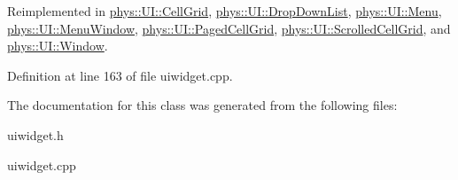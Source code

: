 Reimplemented in \hyperlink{classphys_1_1UI_1_1CellGrid_addbc1338b3b321018cbaf3ff787837e5}{phys::UI::CellGrid}, \hyperlink{classphys_1_1UI_1_1DropDownList_aa204411b17521b92acb78926d1d3f98e}{phys::UI::DropDownList}, \hyperlink{classphys_1_1UI_1_1Menu_a60a678cc2be8f3eebfe65b3628557928}{phys::UI::Menu}, \hyperlink{classphys_1_1UI_1_1MenuWindow_a9845f7bd61f5c3f06594c4bbcbd4e063}{phys::UI::MenuWindow}, \hyperlink{classphys_1_1UI_1_1PagedCellGrid_a7d6ddd7126f86d2ea6592ac3f9a91037}{phys::UI::PagedCellGrid}, \hyperlink{classphys_1_1UI_1_1ScrolledCellGrid_aed1f61cbdab04c555e26076ec933bbf2}{phys::UI::ScrolledCellGrid}, and \hyperlink{classphys_1_1UI_1_1Window_a0be6c93e5660757a5f94227f2e076ba9}{phys::UI::Window}.



Definition at line 163 of file uiwidget.cpp.



The documentation for this class was generated from the following files:\begin{DoxyCompactItemize}
\item 
uiwidget.h\item 
uiwidget.cpp\end{DoxyCompactItemize}
